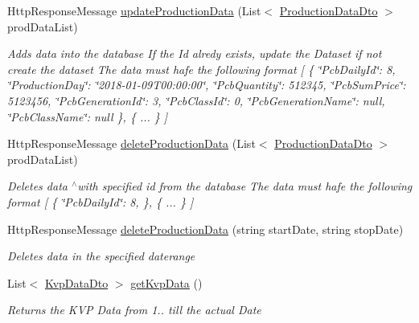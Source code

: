 \begin{DoxyCompactItemize}
Http\+Response\+Message \hyperlink{classkpi_mvc_api_1_1_controllers_1_1_kpidata_controller_a82f308e9ae4809dfdca3ce685af05774}{update\+Production\+Data} (List$<$ \hyperlink{classkpi_mvc_api_1_1_data_transfer_objects_1_1_production_data_dto}{Production\+Data\+Dto} $>$ prod\+Data\+List)
\begin{DoxyCompactList}\small\item\em Adds data into the database If the Id alredy exists, update the Dataset if not create the dataset The data must hafe the following format \mbox{[} \{ \char`\"{}\+Pcb\+Daily\+Id\char`\"{}\+: 8, \char`\"{}\+Production\+Day\char`\"{}\+: \char`\"{}2018-\/01-\/09\+T00\+:00\+:00\char`\"{}, \char`\"{}\+Pcb\+Quantity\char`\"{}\+: 512345, \char`\"{}\+Pcb\+Sum\+Price\char`\"{}\+: 5123456, \char`\"{}\+Pcb\+Generation\+Id\char`\"{}\+: 3, \char`\"{}\+Pcb\+Class\+Id\char`\"{}\+: 0, \char`\"{}\+Pcb\+Generation\+Name\char`\"{}\+: null, \char`\"{}\+Pcb\+Class\+Name\char`\"{}\+: null \}, \{ ... \} \mbox{]} \end{DoxyCompactList}\item 
Http\+Response\+Message \hyperlink{classkpi_mvc_api_1_1_controllers_1_1_kpidata_controller_af1c1e99336a8408bbe4b637cfaaddc4b}{delete\+Production\+Data} (List$<$ \hyperlink{classkpi_mvc_api_1_1_data_transfer_objects_1_1_production_data_dto}{Production\+Data\+Dto} $>$ prod\+Data\+List)
\begin{DoxyCompactList}\small\item\em Deletes data $^\wedge$with specified id from the database The data must hafe the following format \mbox{[} \{ \char`\"{}\+Pcb\+Daily\+Id\char`\"{}\+: 8, \}, \{ ... \} \mbox{]} \end{DoxyCompactList}\item 
Http\+Response\+Message \hyperlink{classkpi_mvc_api_1_1_controllers_1_1_kpidata_controller_a10ba0d225612ba751e0948c601db9a9d}{delete\+Production\+Data} (string start\+Date, string stop\+Date)
\begin{DoxyCompactList}\small\item\em Deletes data in the specified daterange \end{DoxyCompactList}\item 
List$<$ \hyperlink{classkpi_mvc_api_1_1_data_transfer_objects_1_1_kvp_data_dto}{Kvp\+Data\+Dto} $>$ \hyperlink{classkpi_mvc_api_1_1_controllers_1_1_kpidata_controller_ae5b9cebd2043650b2fd60caa72e49da7}{get\+Kvp\+Data} ()
\begin{DoxyCompactList}\small\item\em Returns the K\+VP Data from 1.. till the actual Date \end{DoxyCompactList}\item 

\end{DoxyCompactItemize}
